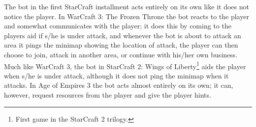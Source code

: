 The bot in the first StarCraft\cite{scbw} installment acts entirely on its own like it does not notice the player. In WarCraft 3: The Frozen Throne\cite{wc3ft} the bot reacts to the player and somewhat communicates with the player; it does this by coming to the players aid if s/he is under attack, and whenever the bot is about to attack an area it pings the minimap showing the location of attack, the player can then choose to join, attack in another area, or continue with his/her own business. Much like WarCraft 3, the bot in StarCraft 2: Wings of Liberty\footnote{First game in the StarCraft 2 trilogy.}\cite{sc2wol} aids the player when s/he is under attack, although it does not ping the minimap when it attacks. In Age of Empires 3\cite{ageofempires3} the bot acts almost entirely on its own; it can, however, request resources from the player and give the player hints.